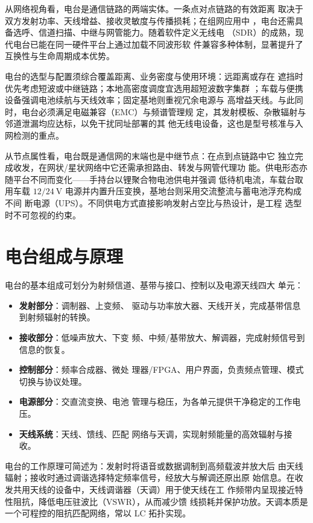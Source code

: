 从网络视角看，电台是通信链路的两端实体。一条点对点链路的有效距离
取决于双方发射功率、天线增益、接收灵敏度与传播损耗；在组网应用中
，电台还需具备选呼、信道扫描、中继与网管能力。随着软件定义无线电
（SDR）的成熟，现代电台已能在同一硬件平台上通过加载不同波形软
件兼容多种体制，显著提升了互换性与生命周期成本优势。

电台的选型与配置须综合覆盖距离、业务密度与使用环境：远距离或存在
遮挡时优先考虑短波或中继链路；本地高密度调度宜选用超短波数字集群
；车载与便携设备强调电池续航与天线效率；固定基地则重视冗余电源与
高增益天线。与此同时，电台必须满足电磁兼容（EMC）与频谱管理规
定，其发射模板、杂散辐射与邻道泄漏均应达标，以免干扰同址部署的其
他无线电设备，这也是型号核准与入网检测的重点。

从节点属性看，电台既是通信网的末端也是中继节点：在点到点链路中它
独立完成收发，在网状/星状网络中它还需承担路由、转发与网管代理功
能。供电形态亦随平台不同而变化——手持台以锂聚合物电池供电并强调
低待机电流，车载台取用车载 $12/24\ \mathrm{V}
$ 电源并内置升压变换，基地台则采用交流整流与蓄电池浮充构成不间
断电源（UPS）。不同供电方式直接影响发射占空比与热设计，是工程
选型时不可忽视的约束。

\section{电台组成与原理}
\label{sec:radio_station_components}

电台的基本组成可划分为射频信道、基带与接口、控制以及电源天线四大
单元：

\begin{itemize}
    \item \textbf{发射部分}：调制器、上变频、
驱动与功率放大器、天线开关，完成基带信息到射频辐射的转换。
    \item \textbf{接收部分}：低噪声放大、下变
频、中频/基带放大、解调器，完成射频信号到信息的恢复。
    \item \textbf{控制部分}：频率合成器、微处
理器/FPGA、用户界面，负责频点管理、模式切换与协议处理。
    \item \textbf{电源部分}：交直流变换、电池
管理与稳压，为各单元提供干净稳定的工作电压。
    \item \textbf{天线系统}：天线、馈线、匹配
网络与天调，实现射频能量的高效辐射与接收。
\end{itemize}

电台的工作原理可简述为：发射时将语音或数据调制到高频载波并放大后
由天线辐射；接收时通过调谐选择特定频率信号，经放大与解调还原出原
始信息。在收发共用天线的设备中，天线调谐器（天调）用于使天线在工
作频带内呈现接近特性阻抗，降低电压驻波比（VSWR），从而减少馈
线损耗并保护功放。天调本质是一个可程控的阻抗匹配网络，常以 LC
 拓扑实现。

